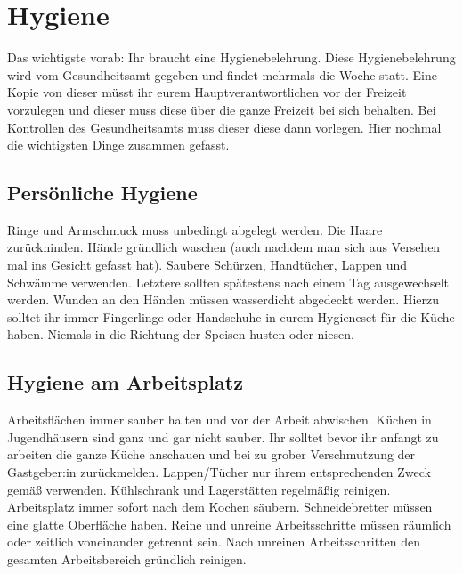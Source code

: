 \section{Hygiene}\label{sec:hygiene}
Das wichtigste vorab: Ihr braucht eine Hygienebelehrung.
Diese Hygienebelehrung wird vom Gesundheitsamt gegeben und findet mehrmals die Woche statt.
Eine Kopie von dieser müsst ihr eurem Hauptverantwortlichen vor der Freizeit vorzulegen und dieser muss diese über die ganze Freizeit bei sich behalten.
Bei Kontrollen des Gesundheitsamts muss dieser diese dann vorlegen.
Hier nochmal die wichtigsten Dinge zusammen gefasst.
\subsection{Persönliche Hygiene}\label{subsec:personliche-hygiene}
Ringe und Armschmuck muss unbedingt abgelegt werden.
Die Haare zurückninden.
Hände gründlich waschen (auch nachdem man sich aus Versehen mal ins Gesicht gefasst hat).
Saubere Schürzen, Handtücher, Lappen und Schwämme verwenden.
Letztere sollten spätestens nach einem Tag ausgewechselt werden.
Wunden an den Händen müssen wasserdicht abgedeckt werden.
Hierzu solltet ihr immer Fingerlinge oder Handschuhe in eurem Hygieneset für die Küche haben.
Niemals in die Richtung der Speisen husten oder niesen.

\subsection{Hygiene am Arbeitsplatz}\label{subsec:hygiene-am-arbeitsplatz}
Arbeitsflächen immer sauber halten und vor der Arbeit abwischen.
Küchen in Jugendhäusern sind ganz und gar nicht sauber.
Ihr solltet bevor ihr anfangt zu arbeiten die ganze Küche anschauen und bei zu grober Verschmutzung der Gastgeber:in zurückmelden.
Lappen/Tücher nur ihrem entsprechenden Zweck gemäß verwenden.
Kühlschrank und Lagerstätten regelmäßig reinigen.
Arbeitsplatz immer sofort nach dem Kochen säubern.
Schneidebretter müssen eine glatte Oberfläche haben.
Reine und unreine Arbeitsschritte müssen räumlich oder zeitlich voneinander getrennt sein.
Nach unreinen Arbeitsschritten den gesamten Arbeitsbereich gründlich reinigen.


